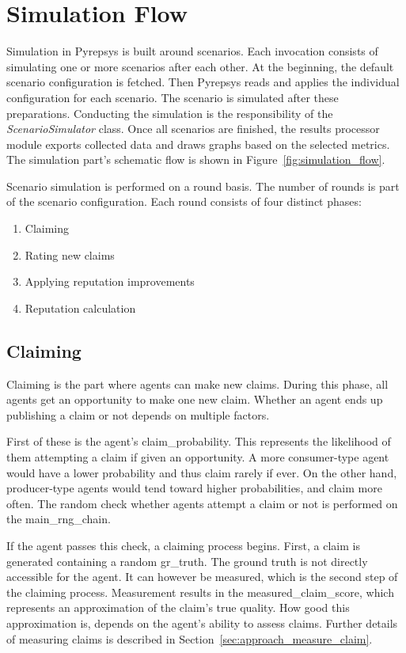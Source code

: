 \documentclass[%
    ]{\PathToTumTemplate/thesis/tum_thesis}
\begin{document}
\section{Simulation Flow}\label{sec:impl_simulation}

Simulation in Pyrepsys is built around \glspl{scenario}.
Each invocation consists of simulating one or more scenarios after each other.
At the beginning, the default scenario configuration is fetched.
Then Pyrepsys reads and applies the individual configuration for each scenario.
The scenario is simulated after these preparations.
Conducting the simulation is the responsibility of the \emph{ScenarioSimulator} class.
Once all scenarios are finished, the results processor module exports collected data and draws graphs based on the selected metrics.
The simulation part's schematic flow is shown in Figure~\ref{fig:simulation_flow}.

Scenario simulation is performed on a round basis.
The number of rounds is part of the scenario configuration.
Each round consists of four distinct phases:

\begin{enumerate}
	\item Claiming
	\item Rating new claims
	\item Applying reputation improvements
	\item Reputation calculation
\end{enumerate}

\subsection{Claiming}
Claiming is the part where agents can make new \glspl{claim}.
During this phase, all agents get an opportunity to make one new claim.
Whether an agent ends up publishing a claim or not depends on multiple factors.

First of these is the agent's \gls{claim_probability}.
This represents the likelihood of them attempting a claim if given an opportunity.
A more consumer-type agent would have a lower probability and thus claim rarely if ever.
On the other hand, producer-type agents would tend toward higher probabilities, and claim more often.
The random check whether agents attempt a claim or not is performed on the \gls{main_rng_chain}.

If the agent passes this check, a claiming process begins.
First, a claim is generated containing a random \gls{gr_truth}. 
The ground truth is not directly accessible for the agent.
It can however be measured, which is the second step of the claiming process.
Measurement results in the \gls{measured_claim_score}, which represents an approximation of the claim's true quality.
How good this approximation is, depends on the agent's ability to assess claims.
Further details of measuring claims is described in Section~\ref{sec:approach_measure_claim}.
\end{document}
